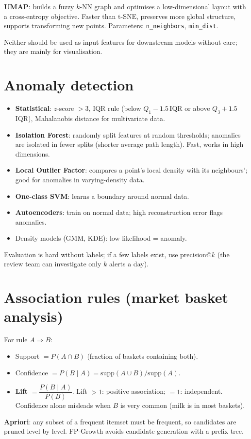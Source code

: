 \textbf{UMAP}: builds a fuzzy $k$-NN graph and optimises a low-dimensional layout with a cross-entropy objective. Faster than t-SNE, preserves more global structure, supports transforming new points. Parameters: \texttt{n\_neighbors}, \texttt{min\_dist}.

Neither should be used as input features for downstream models without care; they are mainly for visualisation.

\section{Anomaly detection}
\begin{itemize}
  \item \textbf{Statistical}: $z$-score $>3$, IQR rule (below $Q_1-1.5\,$IQR or above $Q_3+1.5\,$IQR), Mahalanobis distance for multivariate data.
  \item \textbf{Isolation Forest}: randomly split features at random thresholds; anomalies are isolated in fewer splits (shorter average path length). Fast, works in high dimensions.
  \item \textbf{Local Outlier Factor}: compares a point's local density with its neighbours'; good for anomalies in varying-density data.
  \item \textbf{One-class SVM}: learns a boundary around normal data.
  \item \textbf{Autoencoders}: train on normal data; high reconstruction error flags anomalies.
  \item Density models (GMM, KDE): low likelihood = anomaly.
\end{itemize}
Evaluation is hard without labels; if a few labels exist, use precision@$k$ (the review team can investigate only $k$ alerts a day).

\section{Association rules (market basket analysis)}
For rule $A\Rightarrow B$:
\begin{itemize}
  \item Support $=P(A\cap B)$ (fraction of baskets containing both).
  \item Confidence $=P(B\mid A)=\text{supp}(A\cup B)/\text{supp}(A)$.
  \item \textbf{Lift} $=\dfrac{P(B\mid A)}{P(B)}$. Lift $>1$: positive association; $=1$: independent. Confidence alone misleads when $B$ is very common (milk is in most baskets).
\end{itemize}
\textbf{Apriori}: any subset of a frequent itemset must be frequent, so candidates are pruned level by level. FP-Growth avoids candidate generation with a prefix tree.

